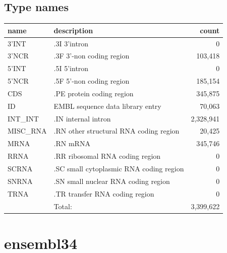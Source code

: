 \documentclass{article}
\begin{document}
\begin{Schunk}
\subsection{Type names}
\noindent\begin{tabular}{llr}
\hline \hline
name & description & count \\
\hline
3'INT  &  .3I 3'intron  &  0 \\
3'NCR  &  .3F  3'-non coding region  &  103,418 \\
5'INT  &  .5I 5'intron  &  0 \\
5'NCR  &  .5F  5'-non coding region  &  185,154 \\
CDS  &  .PE protein coding region  &  345,875 \\
ID  &  EMBL sequence data library entry  &  70,063 \\
INT\_INT  &  .IN  internal intron  &  2,328,941 \\
MISC\_RNA  &  .RN other structural RNA coding region  &  20,425 \\
MRNA  &  .RN mRNA  &  345,746 \\
RRNA  &  .RR ribosomal RNA coding region  &  0 \\
SCRNA  &  .SC small cytoplasmic RNA coding region  &  0 \\
SNRNA  &  .SN small nuclear RNA coding region  &  0 \\
TRNA  &  .TR transfer RNA coding region  &  0 \\
\hline
 & Total: & 3,399,622 \\
\hline \hline
\end{tabular}

\section{ ensembl34 }

\end{Schunk}
\end{document}
